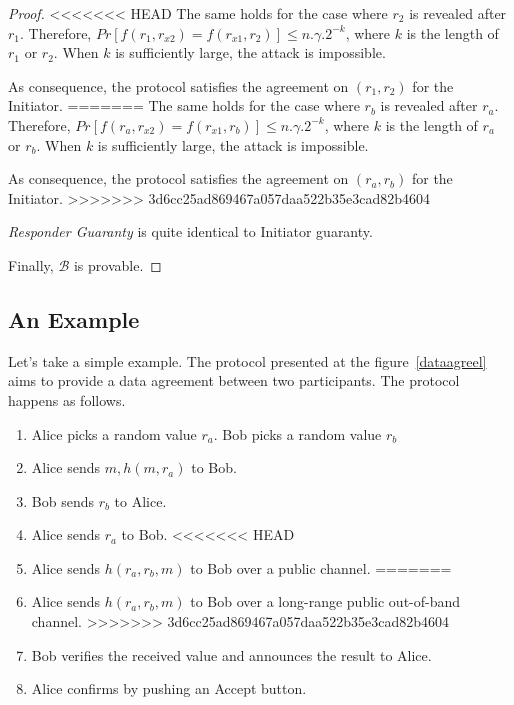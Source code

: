 \begin{proof}
<<<<<<< HEAD
The same holds for the case where $r_2$ is revealed after $r_1$. Therefore, $Pr[f(r_1,r_{x2}) = f(r_{x1},r_2)] \leq n.\gamma.2^{-k}$, where $k$ is the length of $r_1$ or $r_2$. When $k$ is sufficiently large, the attack is impossible. 

As consequence, the protocol satisfies the agreement on $(r_1,r_2)$ for the Initiator. 
=======
The same holds for the case where $r_b$ is revealed after $r_a$. Therefore, $Pr[f(r_a,r_{x2}) = f(r_{x1},r_b)] \leq n.\gamma.2^{-k}$, where $k$ is the length of $r_a$ or $r_b$. When $k$ is sufficiently large, the attack is impossible. 

As consequence, the protocol satisfies the agreement on $(r_a,r_b)$ for the Initiator. 
>>>>>>> 3d6cc25ad869467a057daa522b35e3cad82b4604

\emph{Responder Guaranty} is quite identical to Initiator guaranty. 

Finally, $\mathcal{B}$ is provable. 
\end{proof}

\subsection{An Example}
Let's take a simple example. The protocol presented at the figure~\ref{dataagreel} aims to provide a data agreement between two participants. The protocol happens as follows.
\begin{enumerate}
\item Alice picks a random value $r_a$. Bob picks a random value $r_b$
\item Alice sends $m,h(m,r_a)$ to Bob.
\item Bob sends $r_b$ to Alice.
\item Alice sends $r_a$ to Bob.
<<<<<<< HEAD
\item Alice sends $h(r_a,r_b,m)$ to Bob over a public channel. 
=======
\item Alice sends $h(r_a,r_b,m)$ to Bob over a long-range public out-of-band channel. 
>>>>>>> 3d6cc25ad869467a057daa522b35e3cad82b4604
\item Bob verifies the received value and announces the result to Alice. 
\item Alice confirms by pushing an Accept button. 
\end{enumerate}


